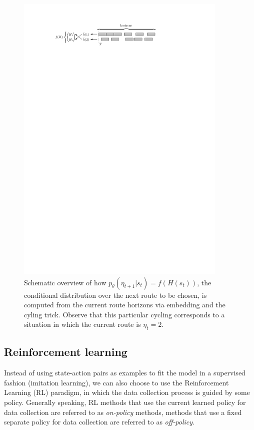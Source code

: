 \documentclass[a4paper]{article}
\theoremstyle{definition}
\theoremstyle{plain}
\begin{document}
\begin{figure}
  \centering
  \includegraphics[width=0.9\textwidth]{figures/single/embedding}
  \caption{Schematic overview of how
    $p_{\theta}(\eta_{t+1} | s_{t}) = f(H(s_{t}))$, the conditional distribution
    over the next route to be chosen, is computed from the current route
    horizons via embedding and the cyling trick. Observe that this particular
    cycling corresponds to a situation in which the current route is
    $\eta_{t} = 2$.}\label{fig:neural_embedding}
\end{figure}

\subsection{Reinforcement learning}

Instead of using state-action pairs as examples to fit the model in a supervised
fashion (imitation learning), we can also choose to use the Reinforcement
Learning (RL) paradigm, in which the data collection process is guided by some
policy. Generally speaking, RL methods that use the current learned policy for
data collection are referred to as \textit{on-policy} methods, methods that use
a fixed separate policy for data collection are referred to as
\textit{off-policy}.
\end{document}
